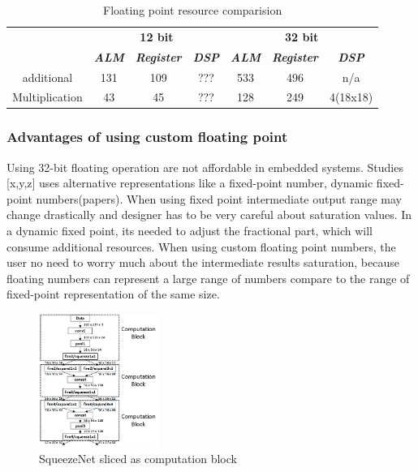 \documentclass[conference]{IEEEtran}
\begin{document}
\begin{table}[htbp]
\caption{Floating point resource comparision}
\begin{center}
\begin{tabular}{|c|c|c|c|c|c|c|}
\hline
				&\multicolumn{3}{|c|}{\textbf{12 bit}} 											&\multicolumn{3}{|c|}{\textbf{32 bit}}\\
				\cline{2-7} 
 				& \textbf{\textit{ALM}} & \textbf{\textit{Register}} & \textbf{\textit{DSP}}	& \textbf{\textit{ALM}}	& \textbf{\textit{Register}} & \textbf{\textit{DSP}}\\
\hline
additional 		& 131 					& 109 							& ??? 					& 533					&496						&n/a  \\
\hline
Multiplication	& 43 					& 45 							& ??? 					& 128					&249						&4(18x18)  \\
\hline
\end{tabular}
\label{tab1}
\end{center}
\end{table}



\subsubsection{Advantages of using custom floating point
}
Using 32-bit floating operation are not affordable in embedded systems. Studies [x,y,z] uses alternative representations like a fixed-point number, dynamic fixed-point numbers(papers). When using fixed point intermediate output range may change drastically and designer has to be very careful about saturation values. In a dynamic fixed point, its needed to adjust the fractional part, which will consume additional resources. When using custom floating point numbers, the user no need to worry much about the intermediate results saturation, because floating numbers can represent a large range of numbers compare to the range of fixed-point representation of the same size. 




\begin{figure}[htbp]
\centerline{\includegraphics[width=0.35\textwidth]{index.jpeg}}
\caption{SqueezeNet sliced as computation block}
\label{sqz}
\end{figure}
\end{document}
